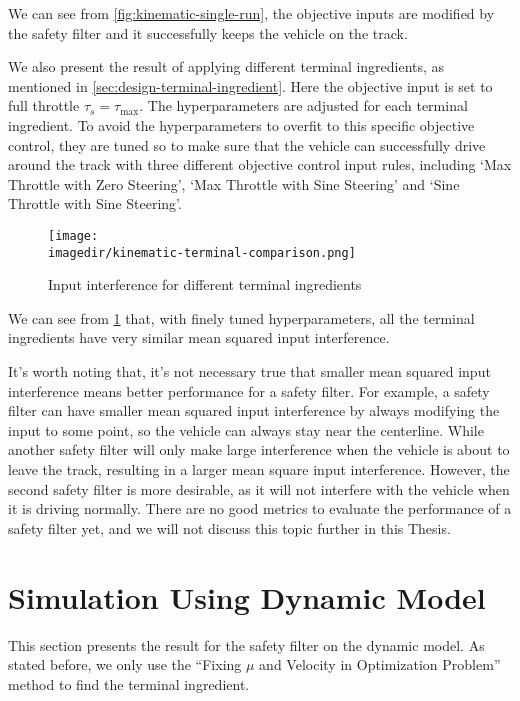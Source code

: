 We can see from \cref{fig:kinematic-single-run}, the objective inputs are modified by the safety filter and it successfully keeps the vehicle on the track.

We also present the result of applying different terminal ingredients, as mentioned in \cref{sec:design-terminal-ingredient}.
Here the objective input is set to full throttle $\tau_s = \tau_{\max}$.
The hyperparameters are adjusted for each terminal ingredient.
To avoid the hyperparameters to overfit to this specific objective control, they are tuned so to make sure that the vehicle can successfully drive around the track with three different objective control input rules, including `Max Throttle with Zero Steering', `Max Throttle with Sine Steering' and `Sine Throttle with Sine Steering'.

\begin{figure}[ht]
    \centering
    \texttt{[image: \\imagedir/kinematic-terminal-comparison.png]}
    \caption{Input interference for different terminal ingredients}
    \label{fig:kinematic-terminal-comparison}
\end{figure}

We can see from \cref{fig:kinematic-terminal-comparison} that, with finely tuned hyperparameters, all the terminal ingredients have very similar mean squared input interference.

It's worth noting that, it's not necessary true that smaller mean squared input interference means better performance for a safety filter.
For example, a safety filter can have smaller mean squared input interference by always modifying the input to some point, so the vehicle can always stay near the centerline.
While another safety filter will only make large interference when the vehicle is about to leave the track, resulting in a larger mean square input interference.
However, the second safety filter is more desirable, as it will not interfere with the vehicle when it is driving normally.
There are no good metrics to evaluate the performance of a safety filter yet, and we will not discuss this topic further in this Thesis.


\section{Simulation Using Dynamic Model}\label{sec:result-dynamic-model}

This section presents the result for the safety filter on the dynamic model.
As stated before, we only use the ``Fixing $\mu$ and Velocity in Optimization Problem'' method to find the terminal ingredient.

